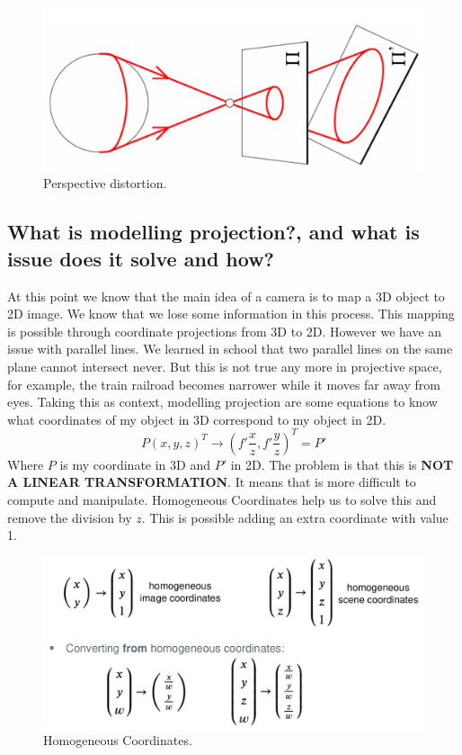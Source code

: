 \documentclass{article}
\begin{document}
\begin{figure}[H]
\centering
\includegraphics[scale=0.2]{pdist.png}
\caption{Perspective distortion.}
\label{fig:img2}
\end{figure}

\subsection{What is modelling projection?, and what is issue does it solve and how?}
At this point we know that the main idea of a camera is to map a 3D object to 2D image. We
know that we lose some information in this process. This mapping is possible through coordinate
projections from 3D to 2D. However we have an issue with parallel lines. We learned in school
that two parallel lines on the same plane cannot intersect never. But this is not true any more
in projective space, for example, the train railroad  becomes narrower while it moves far away
from eyes.
Taking this as context, modelling projection are some equations to know what coordinates of my object
in 3D correspond to my object in 2D.
\[P(x, y, z)^T \rightarrow (f'\frac{x}{z}, f'\frac{y}{z})^T=P'\]
Where \(P\) is my coordinate in 3D and \(P'\) in 2D. The problem is that this is \textbf{NOT A LINEAR
TRANSFORMATION}. It means that is more difficult to compute and manipulate. Homogeneous Coordinates help
us to solve this and remove the division by \(z\). This is possible adding an extra coordinate with
value 1.

\begin{figure}[H]
\centering
\includegraphics[scale=0.2]{homocoord.png}
\caption{Homogeneous Coordinates.}
\label{fig:img2}
\end{figure}
\end{document}
